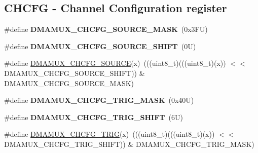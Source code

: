 \subsection*{C\+H\+C\+FG -\/ Channel Configuration register}
\begin{DoxyCompactItemize}
\item 
\mbox{\label{group___d_m_a_m_u_x___register___masks_ga35b279ba0b1c9e817901494cdac305c5}} 
\#define {\bfseries D\+M\+A\+M\+U\+X\+\_\+\+C\+H\+C\+F\+G\+\_\+\+S\+O\+U\+R\+C\+E\+\_\+\+M\+A\+SK}~(0x3\+F\+U)
\item 
\mbox{\label{group___d_m_a_m_u_x___register___masks_gac2b7553c4599d8e919750598dd03f8a3}} 
\#define {\bfseries D\+M\+A\+M\+U\+X\+\_\+\+C\+H\+C\+F\+G\+\_\+\+S\+O\+U\+R\+C\+E\+\_\+\+S\+H\+I\+FT}~(0\+U)
\item 
\#define \mbox{\hyperlink{group___d_m_a_m_u_x___register___masks_ga26ed125b670223f11ea326335729bb9b}{D\+M\+A\+M\+U\+X\+\_\+\+C\+H\+C\+F\+G\+\_\+\+S\+O\+U\+R\+CE}}(x)~(((uint8\+\_\+t)(((uint8\+\_\+t)(x)) $<$$<$ D\+M\+A\+M\+U\+X\+\_\+\+C\+H\+C\+F\+G\+\_\+\+S\+O\+U\+R\+C\+E\+\_\+\+S\+H\+I\+FT)) \& D\+M\+A\+M\+U\+X\+\_\+\+C\+H\+C\+F\+G\+\_\+\+S\+O\+U\+R\+C\+E\+\_\+\+M\+A\+SK)
\item 
\mbox{\label{group___d_m_a_m_u_x___register___masks_gafd2b6158f86bedffb640e73c40cdd0f5}} 
\#define {\bfseries D\+M\+A\+M\+U\+X\+\_\+\+C\+H\+C\+F\+G\+\_\+\+T\+R\+I\+G\+\_\+\+M\+A\+SK}~(0x40\+U)
\item 
\mbox{\label{group___d_m_a_m_u_x___register___masks_ga714a6b142fde49d701e3f624bb2417e1}} 
\#define {\bfseries D\+M\+A\+M\+U\+X\+\_\+\+C\+H\+C\+F\+G\+\_\+\+T\+R\+I\+G\+\_\+\+S\+H\+I\+FT}~(6\+U)
\item 
\#define \mbox{\hyperlink{group___d_m_a_m_u_x___register___masks_ga7f31af225c1b0eca76b430ba76b5e516}{D\+M\+A\+M\+U\+X\+\_\+\+C\+H\+C\+F\+G\+\_\+\+T\+R\+IG}}(x)~(((uint8\+\_\+t)(((uint8\+\_\+t)(x)) $<$$<$ D\+M\+A\+M\+U\+X\+\_\+\+C\+H\+C\+F\+G\+\_\+\+T\+R\+I\+G\+\_\+\+S\+H\+I\+FT)) \& D\+M\+A\+M\+U\+X\+\_\+\+C\+H\+C\+F\+G\+\_\+\+T\+R\+I\+G\+\_\+\+M\+A\+SK)
\item 
\mbox{\label{group___d_m_a_m_u_x___register___masks_ga311ccb0a9a00f29da44f8c41b33ba79f}} 

\end{DoxyCompactItemize}
